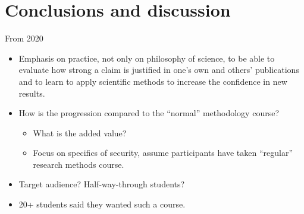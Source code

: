 %
%
%
%


\section{Conclusions and discussion}

\begin{frame}
  \begin{block}{From 2020}
    \begin{itemize}
      \item<+> Emphasis on practice, not only on philosophy of science, to be 
        able to evaluate how strong a claim is justified in one's own and 
        others' publications and to learn to apply scientific methods to 
        increase the confidence in new results.

      \item<+> How is the progression compared to the \enquote{normal} 
        methodology  course?
        \begin{itemize}
          \item What is the added value?
          \item Focus on specifics of security, assume participants have taken 
            \enquote{regular} research methods course.
        \end{itemize}

      \item<+> Target audience? Half-way-through students?

      \item<+> 20+ students said they wanted such a course.
    \end{itemize}
  \end{block}
\end{frame}

